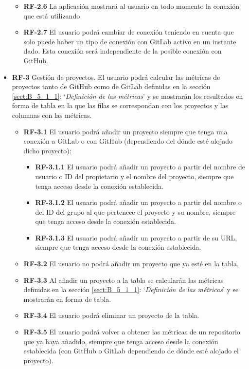 \begin{itemize}
\begin{itemize}
		\item \textbf{RF-2.6} La aplicación mostrará al usuario en todo momento la conexión que está utilizando
		\item \textbf{RF-2.7} El usuario podrá cambiar de conexión teniendo en cuenta que solo puede haber un tipo de conexión con GitLab activo en un instante dado. Esta conexión será independiente de la posible conexión con GitHub.
	\end{itemize}
	\item \textbf{RF-3} Gestión de proyectos. El usuario podrá calcular las métricas de proyectos tanto de GitHub como de GitLab definidas en la sección \ref{sect:B_5_1_1}: `\textit{Definición de las métricas}' y se mostrarán los resultados en forma de tabla en la que las filas se correspondan con los proyectos y las columnas con las métricas.
	\begin{itemize}
		\item \textbf{RF-3.1} El usuario podrá añadir un proyecto siempre que tenga una conexión a GitLab o con GitHub (dependiendo del dónde esté alojado dicho proyecto):
		\begin{itemize}
			\item \textbf{RF-3.1.1} El usuario podrá añadir un proyecto a partir del nombre de usuario o ID del propietario y el nombre del proyecto, siempre que tenga acceso desde la conexión establecida.
			\item \textbf{RF-3.1.2} El usuario podrá añadir un proyecto a partir del nombre o del ID del grupo al que pertenece el proyecto y su nombre, siempre que tenga acceso desde la conexión establecida.
			\item \textbf{RF-3.1.3} El usuario podrá añadir un proyecto a partir de su URL, siempre que tenga acceso desde la conexión establecida.
		\end{itemize}
		\item \textbf{RF-3.2} El usuario no podrá añadir un proyecto que ya esté en la tabla.
		\item \textbf{RF-3.3} Al añadir un proyecto a la tabla se calcularán las métricas definidas en la sección \ref{sect:B_5_1_1}: `\textit{Definición de las métricas}' y se mostrarán en forma de tabla.
		\item \textbf{RF-3.4} El usuario podrá eliminar un proyecto de la tabla.
		\item \textbf{RF-3.5} El usuario podrá volver a obtener las métricas de un repositorio que ya haya añadido, siempre que tenga acceso desde la conexión establecida (con GitHub o GitLab dependiendo de dónde esté alojado el proyecto).

\end{itemize}
\end{itemize}
